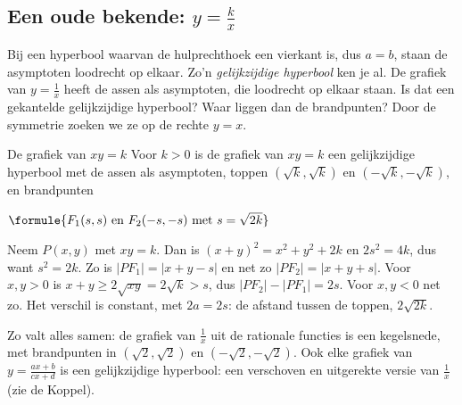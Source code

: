 \subsection{Een oude bekende: \texorpdfstring{$y = \tfrac kx$}{y = k/x}}

Bij een hyperbool waarvan de hulprechthoek een vierkant is, dus $a = b$, staan de asymptoten loodrecht op elkaar. Zo'n \emph{gelijkzijdige hyperbool} ken je al. De grafiek van $y = \tfrac1x$ heeft de assen als asymptoten, die loodrecht op elkaar staan. Is dat een gekantelde gelijkzijdige hyperbool? Waar liggen dan de brandpunten? Door de symmetrie zoeken we ze op de rechte $y = x$.

\begin{theorie}
\begin{stelling}{De grafiek van $xy = k$}
Voor $k > 0$ is de grafiek van $xy = k$ een gelijkzijdige hyperbool met de assen als asymptoten, toppen $(\sqrt k, \sqrt k)$ en $(-\sqrt k, -\sqrt k)$, en brandpunten

\vspace{1mm}
\qquad $\formule{F_1(s, s) \text{ en } F_2(-s, -s) \text{ met } s = \sqrt{2k}}$
\end{stelling}

\begin{bewijs}
Neem $P(x, y)$ met $xy = k$. Dan is $(x + y)^2 = x^2 + y^2 + 2k$ en $2s^2 = 4k$, dus
want $s^2 = 2k$. Zo is $|PF_1| = |x + y - s|$ en net zo $|PF_2| = |x + y + s|$. Voor $x, y > 0$ is $x + y \geqslant 2\sqrt{xy} = 2\sqrt k > s$, dus $|PF_2| - |PF_1| = 2s$. Voor $x, y < 0$ net zo. Het verschil is constant, met $2a = 2s$: de afstand tussen de toppen, $2\sqrt{2k}$.
\end{bewijs}
\end{theorie}

Zo valt alles samen: de grafiek van $\tfrac1x$ uit de rationale functies is een kegelsnede, met brandpunten in $(\sqrt2, \sqrt2)$ en $(-\sqrt2, -\sqrt2)$. Ook elke grafiek van $y = \tfrac{ax + b}{cx + d}$ is een gelijkzijdige hyperbool: een verschoven en uitgerekte versie van $\tfrac1x$ (zie de Koppel).


